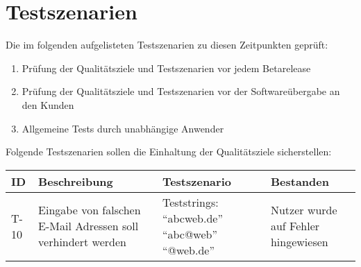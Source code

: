 
\chapter{Testszenarien}
Die im folgenden aufgelisteten Testszenarien zu diesen Zeitpunkten geprüft:
\begin{enumerate}
	\item Prüfung der Qualitätsziele und Testszenarien vor jedem Betarelease
	\item Prüfung der Qualitätsziele und Testszenarien vor der Softwareübergabe an den Kunden
	\item Allgemeine Tests durch unabhängige Anwender
\end{enumerate}

Folgende Testszenarien sollen die Einhaltung der Qualitätsziele sicherstellen:
\begin{tabularx}{\textwidth}{|l|X|X|X|}
\toprule
\textbf{ID} & \textbf{Beschreibung} & \textbf{Testszenario} & \textbf{Bestanden}\\
\endhead
\hline
T-10 & Eingabe von falschen E-Mail Adressen soll verhindert werden & Teststrings: \enquote{abcweb.de} \enquote{abc@web} \enquote{@web.de}& Nutzer wurde auf Fehler hingewiesen  \\
\hline
\end{tabularx}
